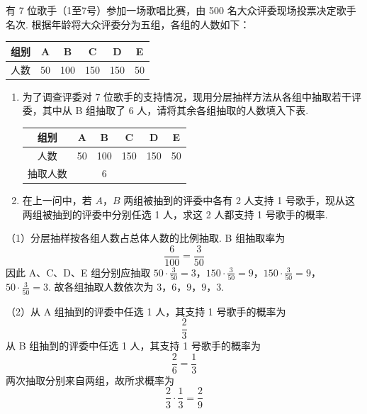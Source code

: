 \begin{problem}
有 7 位歌手（1至7号）参加一场歌唱比赛，由 500 名大众评委现场投票决定歌手名次. 根据年龄将大众评委分为五组，各组的人数如下：

\begin{center}
\begingroup
\small
\renewcommand{\arraystretch}{1.2}
\begin{tabular}{|c|c|c|c|c|c|}
\hline
组别 & A & B & C & D & E \\
\hline
人数 & 50 & 100 & 150 & 150 & 50 \\
\hline
\end{tabular}
\endgroup
\end{center}

\begin{enumerate}
\item 为了调查评委对 7 位歌手的支持情况，现用分层抽样方法从各组中抽取若干评委，其中从 B 组抽取了 6 人，请将其余各组抽取的人数填入下表.

\begin{center}
\begingroup
\small
\renewcommand{\arraystretch}{1.2}
\begin{tabular}{|c|c|c|c|c|c|}
\hline
组别 & A & B & C & D & E \\
\hline
人数 & 50 & 100 & 150 & 150 & 50 \\
\hline
抽取人数 &  & 6 &  &  &  \\
\hline
\end{tabular}
\endgroup
\end{center}

\item 在上一问中，若 \(A\)，\(B\) 两组被抽到的评委中各有 2 人支持 1 号歌手，现从这两组被抽到的评委中分别任选 1 人，求这 2 人都支持 1 号歌手的概率.
\end{enumerate}
\end{problem}

\begin{solution}
（1）分层抽样按各组人数占总体人数的比例抽取. B 组抽取率为
\[
\frac{6}{100}=\frac{3}{50}
\]
因此 A、C、D、E 组分别应抽取
\(50\cdot\frac{3}{50}=3\)，\(150\cdot\frac{3}{50}=9\)，\(150\cdot\frac{3}{50}=9\)，\(50\cdot\frac{3}{50}=3\).
故各组抽取人数依次为 \(3\)，\(6\)，\(9\)，\(9\)，\(3\).

（2）从 A 组抽到的评委中任选 1 人，其支持 1 号歌手的概率为
\[
\frac23
\]
从 B 组抽到的评委中任选 1 人，其支持 1 号歌手的概率为
\[
\frac26=\frac13
\]
两次抽取分别来自两组，故所求概率为
\[
\frac23\cdot\frac13=\frac29
\]
\end{solution}

